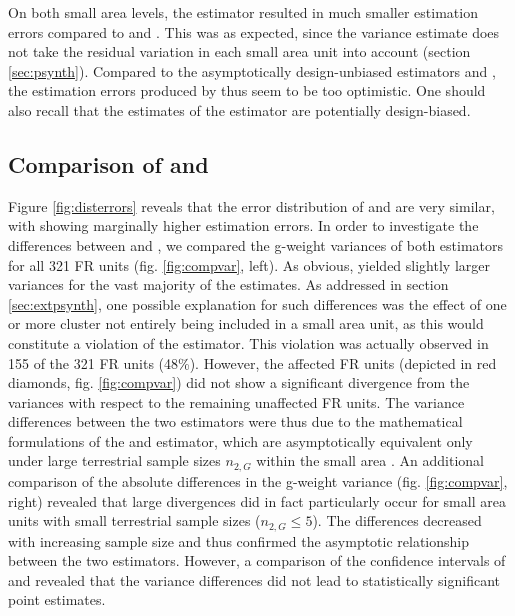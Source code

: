 On both small area levels, the \psynth{} estimator resulted in much smaller estimation errors compared to \psmall{} and \extpsynth{}. This was as expected, since the \psynth{} variance estimate does not take the residual variation in each small area unit into account (section \ref{sec:psynth}). Compared to the asymptotically design-unbiased estimators \psmall{} and \extpsynth{}, the estimation errors produced by \psynth{} thus seem to be too optimistic. One should also recall that the estimates of the \psynth{} estimator are potentially design-biased.





\subsection{Comparison of \psmall{} and \extpsynth{}}
\label{sec:comp}

Figure \ref{fig:disterrors} reveals that the error distribution of \psmall{} and \extpsynth{} are very similar, with \psmall{} showing marginally higher estimation errors. In order to investigate the differences between \psmall{} and \extpsynth{}, we compared the g-weight variances of both estimators for all 321 FR units (fig. \ref{fig:compvar}, left). As obvious, \psmall{} yielded slightly larger variances for the vast majority of the estimates. As addressed in section \ref{sec:extpsynth}, one possible explanation for such differences was the effect of one or more cluster not entirely being included in a small area unit, as this would constitute a violation of the \extpsynth{} estimator. This violation was actually observed in 155 of the 321 FR units (48\%). However, the affected FR units (depicted in red diamonds, fig. \ref{fig:compvar}) did not show a significant divergence from the \psmall{} variances with respect to the remaining unaffected FR units. The variance differences between the two estimators were thus due to the mathematical formulations of the \psmall{} and \extpsynth{} estimator, which are asymptotically equivalent only under large terrestrial sample sizes $n_{2,G}$ within the small area \citep[pp.17--18]{mandallaz2016}. An additional comparison of the absolute differences in the g-weight variance (fig. \ref{fig:compvar}, right) revealed that large divergences did in fact particularly occur for small area units with small terrestrial sample sizes ($n_{2,G} \leq 5$). The differences decreased with increasing sample size and thus confirmed the asymptotic relationship between the two estimators. However, a comparison of the confidence intervals of \psmall{} and \extpsynth{} revealed that the variance differences did not lead to statistically significant point estimates.\par

